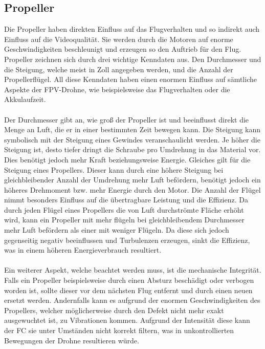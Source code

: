     \subsection[Propeller]{Propeller}
        Die Propeller haben direkten Einfluss auf das Flugverhalten und so indirekt auch Einfluss auf die Videoqualität. Sie werden durch die Motoren auf enorme Geschwindigkeiten beschleunigt und erzeugen so den Auftrieb für den Flug. Propeller zeichnen sich durch drei wichtige Kenndaten aus. Den Durchmesser und die Steigung, welche meist in Zoll angegeben werden, und die Anzahl der Propellerflügel. All diese Kenndaten haben einen enormen Einfluss auf sämtliche Aspekte der FPV-Drohne, wie beispielsweise das Flugverhalten oder die Akkulaufzeit.
        \\ \\
        Der Durchmesser gibt an, wie groß der Propeller ist und beeinflusst direkt die Menge an Luft, die er in einer bestimmten Zeit bewegen kann. Die Steigung kann symbolisch mit der Steigung eines Gewindes veranschaulicht werden. Je höher die Steigung ist, desto tiefer dringt die Schraube pro Umdrehung in das Material vor. Dies benötigt jedoch mehr Kraft beziehungsweise Energie. Gleiches gilt für die Steigung eines Propellers. Dieser kann durch eine höhere Steigung bei gleichbleibender Anzahl der Umdrehung mehr Luft befördern, benötigt jedoch ein höheres Drehmoment bzw. mehr Energie durch den Motor. Die Anzahl der Flügel nimmt besonders Einfluss auf die übertragbare Leistung und die Effizienz. Da durch jeden Flügel eines Propellers die von Luft durchströmte Fläche erhöht wird, kann ein Propeller mit mehr flügeln bei gleichbleibendem Durchmesser mehr Luft befördern als einer mit weniger Flügeln. Da diese sich jedoch gegenseitig negativ beeinflussen und Turbulenzen erzeugen, sinkt die Effizienz, was in einem höheren Energieverbrauch resultiert.
        \\ \\
        Ein weiterer Aspekt, welche beachtet werden muss, ist die mechanische Integrität. Falls ein Propeller beispielsweise durch einen Absturz beschädigt oder verbogen worden ist, sollte dieser vor dem nächsten Flug entfernt und durch einen neuen ersetzt werden. Andernfalls kann es aufgrund der enormen Geschwindigkeiten des Propellers, welcher möglicherweise durch den Defekt nicht mehr exakt ausgewuchtet ist, zu Vibrationen kommen. Aufgrund der Intensität diese kann der FC sie unter Umständen nicht korrekt filtern, was in unkontrollierten Bewegungen der Drohne resultieren würde.
        \\ \\
